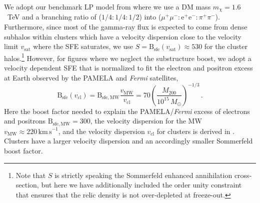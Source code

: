 \documentclass[10pt,aps,pra,reprint,amsmath,amsfonts,amssymb,showpacs,nofootinbib,floatfix]{revtex4-1}
\newcommand{\Fermi}{{\em Fermi}\xspace}
\newcommand{\rmn}{\mathrm}
\newcommand{\sfe}{\rmn{sfe}}
\newcommand{\msun}{M_\odot}
\newcommand{\B}{\rmn{B}}
\newcommand{\sigv}{v_\rmn{cl}}
\newcommand{\mvir}{M_{200}}
\newcommand{\e}{\rmn{e}}
\begin{document}
We adopt our benchmark LP model from \cite{Finkbeiner:2010sm} where we
use a DM mass $m_\chi=1.6$~TeV and a branching ratio of
($1/4:1/4:1/2$) into ($\mu^+\mu^-:\e^+\e^-:\pi^+\pi^-$). Furthermore,
since most of the gamma-ray flux is expected to come from dense
subhalos within clusters which have a velocity dispersion close to the
velocity limit $v_\rmn{sat}$ where the SFE saturates, we use
$S=\B_\sfe(v_\rmn{sat})\approx 530$ for the cluster
halos.\footnote{Note that $S$ is strictly speaking the Sommerfeld
  enhanced annihilation cross-section, but here we have additionally
  included the order unity constraint that ensures that the relic
  density is not over-depleted at freeze-out.} However, for figures
where we neglect the substructure boost, we adopt a velocity dependent
SFE that is normalized to fit the electron and positron excess at
Earth observed by the PAMELA and \Fermi satellites,
\begin{equation}
\B_\sfe(\sigv) = \B_\rmn{sfe,MW} \frac{v_\rmn{MW}}{\sigv} =
70 \left(\frac{\mvir}{10^{15}\,\msun}\right)^{-1/3}\,.
\label{eq:B_sfe}
\end{equation}
Here the boost factor needed to explain the PAMELA/\Fermi excess of
electrons and positrons $\B_\rmn{sfe,MW}=300$, the velocity dispersion
for the MW $v_\rmn{MW} \approx 220\,\rmn{km\,s}^{-1}$, and the
velocity dispersion $\sigv$ for clusters is derived in
\cite{2005RvMP...77..207V}. Clusters have a larger velocity dispersion
and an accordingly smaller Sommerfeld boost factor.
\end{document}
